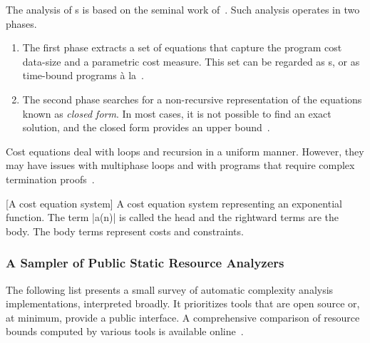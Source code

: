 The analysis of s is based on the seminal work
of~\textcite{wegbreit1975}. Such analysis operates in two phases.

\begin{enumerate}
\item The first phase extracts a set of equations that capture the program cost
\wrt data-size and a parametric cost measure. This set can be regarded as
s, or as time-bound programs à
la~\textcite{rosendahl1989}.

\item The second phase searches for a non-recursive representation of the
equations known as \emph{closed form}. In most cases, it is not possible to find
an exact solution, and the closed form provides an upper
bound~\cite{albert2008}.
\end{enumerate}

Cost equations deal with loops and recursion in a uniform manner. However, they
may have issues with multiphase loops and with programs that require complex
termination proofs~\cite{floresmontoya2014}.

\begin{center}
\begin{minipage}{\textwidth}
\captionsetup{type=lstlisting}
[A cost equation system]{
A cost equation system representing an exponential function.
The term \pr|a(n)| is called the {head} and the rightward terms are the {body}.
The body terms represent costs and constraints.}
\label{lst:ces}
\end{minipage}
\end{center}

\subsubsection{A Sampler of Public Static Resource Analyzers}
\label{resource-analysis-tools}

The following list presents a small survey of automatic complexity analysis implementations, interpreted broadly.
It prioritizes tools that are open source or, at minimum, provide a public interface.
A comprehensive comparison of resource bounds computed by various tools is available online~\cite{flores_experiments}.

